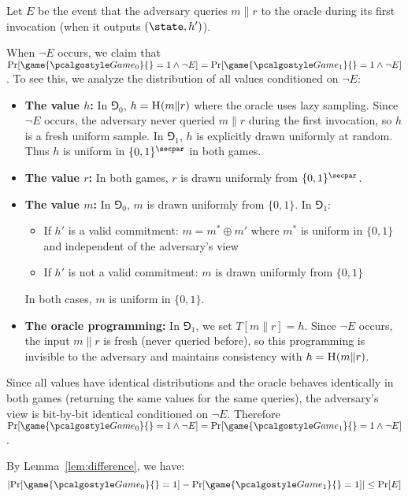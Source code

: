\ifsolutions
\begin{mysolution}
    Let $E$ be the event that the adversary queries $m \| r$ to the oracle during its first invocation (when it outputs $(\state, h')$).
  
  When $\neg E$ occurs, we claim that $\Pr[\game{\Game_0}{} = 1 \wedge \neg E] = \Pr[\game{\Game_1}{} = 1 \wedge \neg E]$. To see this, we analyze the distribution of all values conditioned on $\neg E$:
  
  \begin{itemize}
    \item \textbf{The value $h$:} In $\Game_0$, $h = {\normalfont\textsc{H}}(m \| r)$ where the oracle uses lazy sampling. Since $\neg E$ occurs, the adversary never queried $m \| r$ during the first invocation, so $h$ is a fresh uniform sample. In $\Game_1$, $h$ is explicitly drawn uniformly at random. Thus $h$ is uniform in $\{0,1\}^\secpar$ in both games.
    
    \item \textbf{The value $r$:} In both games, $r$ is drawn uniformly from $\{0,1\}^\secpar$.
    
    \item \textbf{The value $m$:} In $\Game_0$, $m$ is drawn uniformly from $\{0,1\}$. In $\Game_1$:
      \begin{itemize}
        \item If $h'$ is a valid commitment: $m = m^* \oplus m'$ where $m^*$ is uniform in $\{0,1\}$ and independent of the adversary's view
        \item If $h'$ is not a valid commitment: $m$ is drawn uniformly from $\{0,1\}$
      \end{itemize}
      In both cases, $m$ is uniform in $\{0,1\}$.
    
    \item \textbf{The oracle programming:} In $\Game_1$, we set $T[m \| r] = h$. Since $\neg E$ occurs, the input $m \| r$ is fresh (never queried before), so this programming is invisible to the adversary and maintains consistency with $h = {\normalfont\textsc{H}}(m \| r)$.
  \end{itemize}
  
  Since all values have identical distributions and the oracle behaves identically in both games (returning the same values for the same queries), the adversary's view is bit-by-bit identical conditioned on $\neg E$. Therefore $\Pr[\game{\Game_0}{} = 1 \wedge \neg E] = \Pr[\game{\Game_1}{} = 1 \wedge \neg E]$.
  
  By Lemma~\ref{lem:difference}, we have:
  \[
  \left|\Pr[\game{\Game_0}{} = 1] - \Pr[\game{\Game_1}{} = 1]\right| \leq \Pr[E]
  \]
  

\end{mysolution}
